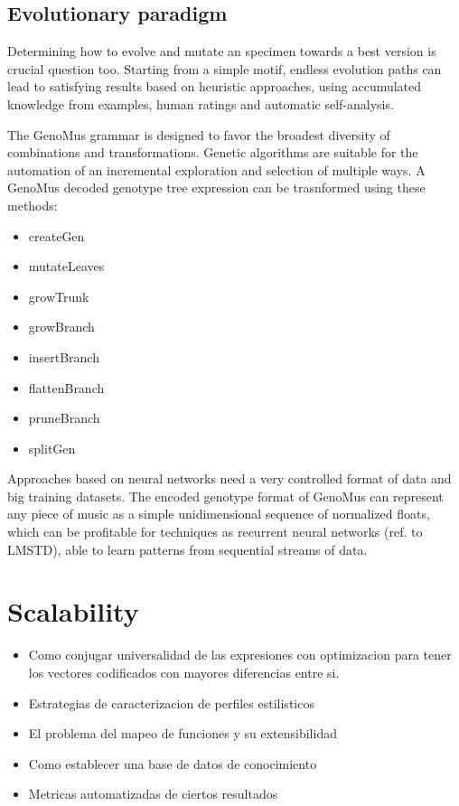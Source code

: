 \documentclass{article}
\begin{document}
\subsection{Evolutionary paradigm}

Determining how to evolve and mutate an specimen towards a best version is crucial question too. Starting from a simple motif, endless evolution paths can lead to satisfying results based on heuristic approaches, using accumulated knowledge from examples, human ratings and automatic self-analysis.

The GenoMus grammar is designed to favor the broadest diversity of combinations and transformations. Genetic algorithms are suitable for the automation of an incremental exploration and selection of multiple ways. A GenoMus decoded genotype tree expression can be trasnformed using these methods:

\begin{itemize}
\item createGen
\item mutateLeaves
\item growTrunk
\item growBranch
\item insertBranch
\item flattenBranch
\item pruneBranch
\item splitGen

\end{itemize}

Approaches based on neural networks need a very controlled format of data and big training datasets. The encoded genotype format of GenoMus can represent any piece of music as a simple unidimensional sequence of normalized floats, which can be profitable for techniques as recurrent neural networks (ref. to LMSTD), able to learn patterns from sequential streams of data.


\section{Scalability}
\begin{itemize}
\item Como conjugar universalidad de las expresiones con optimizacion para tener los vectores codificados con mayores diferencias entre si.
\item Estrategias de caracterizacion de perfiles estilisticos
\item El problema del mapeo de funciones y su extensibilidad
\item Como establecer una base de datos de conocimiento
\item Metricas automatizadas de ciertos resultados
\end{itemize}
\end{document}
